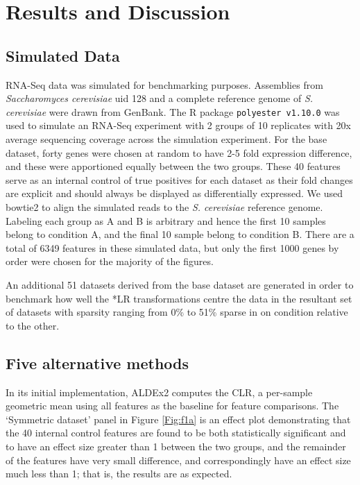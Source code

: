 \documentclass{bmcart}
\begin{document}
\section*{Results and Discussion}

\subsection*{Simulated Data}


RNA-Seq data was simulated for benchmarking purposes. Assemblies from \textit{Saccharomyces cerevisiae} uid 128 and  a complete reference genome of \textit{S. cerevisiae} were drawn from GenBank. The R package \texttt{polyester v1.10.0} \cite{polyester:2016} was used to simulate an RNA-Seq experiment with 2 groups of 10 replicates with 20x average sequencing coverage across the simulation experiment. For the base dataset, forty genes were chosen at random to have 2-5 fold expression difference, and these were apportioned equally between the two groups. These 40 features serve as an internal control of true positives for each dataset as their fold changes are explicit and should always be displayed as differentially expressed. We used bowtie2 \cite{bowtie2} to align the simulated reads  to the \textit{S. cerevisiae} reference genome. Labeling each group as A and B is arbitrary and hence the first 10 samples belong to condition A, and the final 10 sample belong to condition B. There are a total of 6349 features in these simulated data, but only the first 1000 genes by order were chosen for the majority of the figures. 

An additional 51 datasets derived from the base dataset are generated in order to benchmark how well the *LR transformations centre the data in the resultant set of datasets with sparsity ranging from 0\% to 51\% sparse in on condition relative to the other. 


\subsection*{Five alternative methods}


In its initial implementation, ALDEx2 computes the CLR, a per-sample geometric mean using all features as the baseline for feature comparisons. The `Symmetric dataset' panel in Figure \ref{Fig:f1a} is an effect plot demonstrating that the 40 internal control features are found to be both statistically significant and to have an effect size greater than 1 between the two groups, and the remainder of the features have very small difference, and correspondingly have an effect size much less than 1; that is, the results are as expected. 
\end{document}
